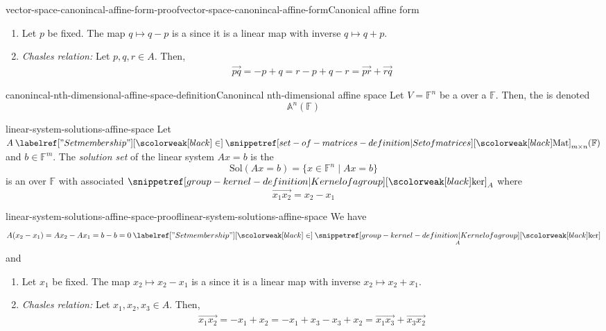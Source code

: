 \documentclass[preview]{standalone}
\begin{document}
\begin{snippetproof}{vector-space-canonincal-affine-form-proof}{vector-space-canonincal-affine-form}{Canonical affine form}
    \begin{enumerate}
        \item Let \(p\) be fixed. The map \(q \mapsto q - p\) is a \bijective[bijection] since it is a linear map with inverse \(q \mapsto q + p\).
        \item \emph{Chasles relation:} Let \(p, q, r \in A\). Then,
        \begin{align*}
            \vec{pq} = -p + q = r-p+q-r = \vec{pr} + \vec{rq}
        \end{align*}
    \end{enumerate}
\end{snippetproof}

\begin{snippetdefinition}{canonincal-nth-dimensional-affine-space-definition}{Canonincal nth-dimensional affine space}
    Let \(V=\mathbb{F}^n\) be a \vectorspace over a \field \(\mathbb{F}\).
    Then, the  \affinespace is denoted
    \[
        \mathbb{A}^n(\mathbb{F})
    \]
\end{snippetdefinition}

\begin{snippetproposition}{linear-system-solutions-affine-space}{}
    Let \(A \in \matrices_{m \times n}(\mathbb{F})\)
    and \(b \in \mathbb{F}^m\).
    The \emph{solution set} of the linear system \(Ax = b\) is the \set
    \[
        \text{Sol}(Ax = b) = \{x \in \mathbb{F}^n \mid Ax = b\}
    \]
    is an \affinespace over \(\mathbb{F}\) with associated \vectorspace
    \(\grpker_A\) where
    \[
        \vec{x_1x_2} = x_2 - x_1
    \]
\end{snippetproposition}

\begin{snippetproof}{linear-system-solutions-affine-space-proof}{linear-system-solutions-affine-space}{}
    We have
    \[
        A(x_2 - x_1) = Ax_2 - Ax_1 = b - b = 0 \in \grpker_A
    \]
    and
    \begin{enumerate}
        \item Let \(x_1\) be fixed. The map \(x_2 \mapsto x_2 - x_1\) is a \bijective[bijection] since it is a linear map with inverse \(x_2 \mapsto x_2 + x_1\).
        \item \emph{Chasles relation:} Let \(x_1, x_2, x_3 \in A\). Then,
        \begin{align*}
            \vec{x_1x_2} = -x_1 + x_2 = -x_1 + x_3 - x_3 + x_2 = \vec{x_1x_3} + \vec{x_3x_2}
        \end{align*}
    \end{enumerate}
\end{snippetproof}
\end{document}

